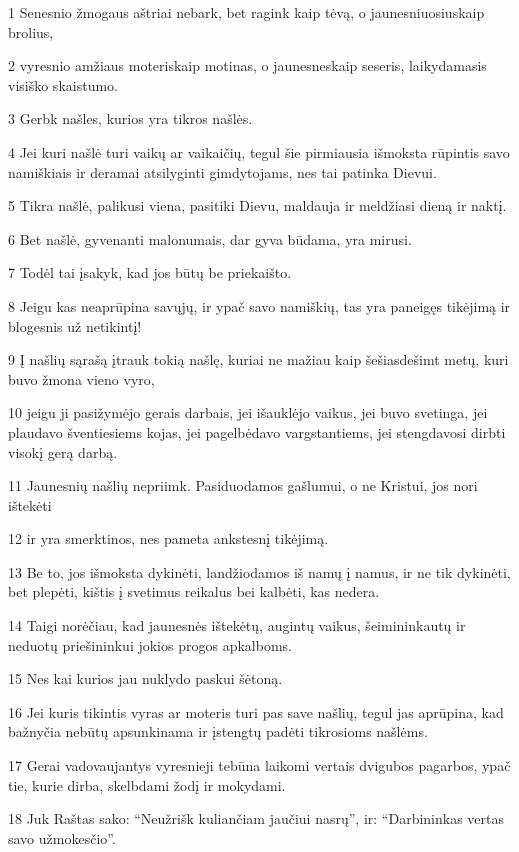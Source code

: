 
\par 1 Senesnio žmogaus aštriai nebark, bet ragink kaip tėvą, o jaunesniuosius­kaip brolius, 
\par 2 vyresnio amžiaus moteris­kaip motinas, o jaunesnes­kaip seseris, laikydamasis visiško skaistumo. 
\par 3 Gerbk našles, kurios yra tikros našlės. 
\par 4 Jei kuri našlė turi vaikų ar vaikaičių, tegul šie pirmiausia išmoksta rūpintis savo namiškiais ir deramai atsilyginti gimdytojams, nes tai patinka Dievui. 
\par 5 Tikra našlė, palikusi viena, pasitiki Dievu, maldauja ir meldžiasi dieną ir naktį. 
\par 6 Bet našlė, gyvenanti malonumais, dar gyva būdama, yra mirusi. 
\par 7 Todėl tai įsakyk, kad jos būtų be priekaišto. 
\par 8 Jeigu kas neaprūpina savųjų, ir ypač savo namiškių, tas yra paneigęs tikėjimą ir blogesnis už netikintį! 
\par 9 Į našlių sąrašą įtrauk tokią našlę, kuriai ne mažiau kaip šešiasdešimt metų, kuri buvo žmona vieno vyro, 
\par 10 jeigu ji pasižymėjo gerais darbais, jei išauklėjo vaikus, jei buvo svetinga, jei plaudavo šventiesiems kojas, jei pagelbėdavo vargstantiems, jei stengdavosi dirbti visokį gerą darbą. 
\par 11 Jaunesnių našlių nepriimk. Pasiduodamos gašlumui, o ne Kristui, jos nori ištekėti 
\par 12 ir yra smerktinos, nes pameta ankstesnį tikėjimą. 
\par 13 Be to, jos išmoksta dykinėti, landžiodamos iš namų į namus, ir ne tik dykinėti, bet plepėti, kištis į svetimus reikalus bei kalbėti, kas nedera. 
\par 14 Taigi norėčiau, kad jaunesnės ištekėtų, augintų vaikus, šeimininkautų ir neduotų priešininkui jokios progos apkalboms. 
\par 15 Nes kai kurios jau nuklydo paskui šėtoną. 
\par 16 Jei kuris tikintis vyras ar moteris turi pas save našlių, tegul jas aprūpina, kad bažnyčia nebūtų apsunkinama ir įstengtų padėti tikrosioms našlėms. 
\par 17 Gerai vadovaujantys vyresnieji tebūna laikomi vertais dvigubos pagarbos, ypač tie, kurie dirba, skelbdami žodį ir mokydami. 
\par 18 Juk Raštas sako: “Neužrišk kuliančiam jaučiui nasrų”, ir: “Darbininkas vertas savo užmokesčio”. 
